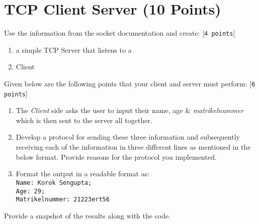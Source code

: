 \documentclass{scrartcl}
\begin{document}

\section{TCP Client Server (10 Points)}

Use the information from the socket documentation and create: [\texttt{4 points}]
\begin{enumerate}
\item a simple TCP Server that listens to a
\item Client
\end{enumerate}
Given below are the following points that your client and server must perform: [\texttt{6 points}]
\begin{enumerate}
\item The \emph{Client} side asks the user to input their name, age \& \emph{matrikelnummer} which is then sent to the server all together.
\item Develop a protocol for sending these three information and subsequently receiving each of the information in three different lines as mentioned in the below format. Provide reasons for the protocol you implemented. 
\item Format the output in a readable format as:\texttt{\\ Name: Korok Sengupta; \\ Age: 29; \\ Matrikelnummer: 21223ert56}
\end{enumerate}

Provide a snapshot of the results along with the code. \\
\end{document}
